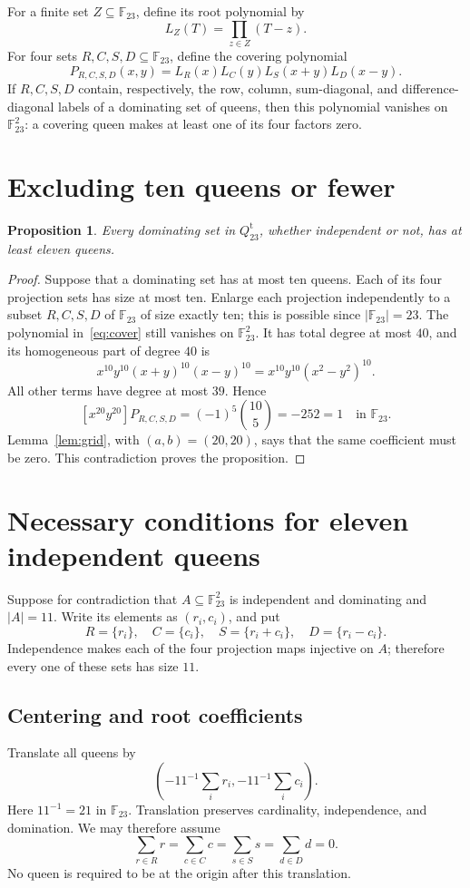 \documentclass[11pt,a4paper]{article}
\newtheorem{proposition}[theorem]{Proposition}
\theoremstyle{remark}
\newcommand{\F}{\mathbb F_{23}}
\newcommand{\Qt}{Q_{23}^{\mathrm t}}
\newcommand{\coeff}[2]{[#1]#2}
\newcommand{\card}[1]{\lvert#1\rvert}
\begin{document}
For a finite set $Z\subseteq\F$, define its root polynomial by
\[
 L_Z(T)=\prod_{z\in Z}(T-z).
\]
For four sets $R,C,S,D\subseteq\F$, define the covering polynomial
\begin{equation}\label{eq:cover}
 P_{R,C,S,D}(x,y)=L_R(x)L_C(y)L_S(x+y)L_D(x-y).
\end{equation}
If $R,C,S,D$ contain, respectively, the row, column, sum-diagonal, and
difference-diagonal labels of a dominating set of queens, then this polynomial
vanishes on $\F^2$: a covering queen makes at least one of its four factors zero.

\section{Excluding ten queens or fewer}\label{sec:small}
\begin{proposition}\label{prop:ten}
Every dominating set in $\Qt$, whether independent or not, has at least eleven
queens.
\end{proposition}
\begin{proof}
Suppose that a dominating set has at most ten queens. Each of its four
projection sets has size at most ten. Enlarge each projection independently
to a subset $R,C,S,D$ of $\F$ of size exactly ten; this is possible since
$\card{\F}=23$. The polynomial in~\eqref{eq:cover} still vanishes on $\F^2$.
It has total degree at most $40$, and its homogeneous part of degree $40$ is
\[
 x^{10}y^{10}(x+y)^{10}(x-y)^{10}
   =x^{10}y^{10}(x^2-y^2)^{10}.
\]
All other terms have degree at most $39$. Hence
\[
 \coeff{x^{20}y^{20}}{P_{R,C,S,D}}
   =(-1)^5\binom{10}{5}=-252=1\quad\text{in }\F.
\]
Lemma~\ref{lem:grid}, with $(a,b)=(20,20)$, says that the same coefficient
must be zero. This contradiction proves the proposition.
\end{proof}

\section{Necessary conditions for eleven independent queens}\label{sec:eleven}
Suppose for contradiction that $A\subseteq\F^2$ is independent and dominating
and $\card A=11$. Write its elements as $(r_i,c_i)$, and put
\[
 R=\{r_i\},\quad C=\{c_i\},\quad S=\{r_i+c_i\},\quad D=\{r_i-c_i\}.
\]
Independence makes each of the four projection maps injective on $A$;
therefore every one of these sets has size $11$.

\subsection{Centering and root coefficients}
Translate all queens by
\[
 \left(-11^{-1}\sum_i r_i,-11^{-1}\sum_i c_i\right).
\]
Here $11^{-1}=21$ in $\F$. Translation preserves cardinality, independence,
and domination. We may therefore assume
\begin{equation}\label{eq:center}
 \sum_{r\in R}r=\sum_{c\in C}c=\sum_{s\in S}s=\sum_{d\in D}d=0.
\end{equation}
No queen is required to be at the origin after this translation.
\end{document}
